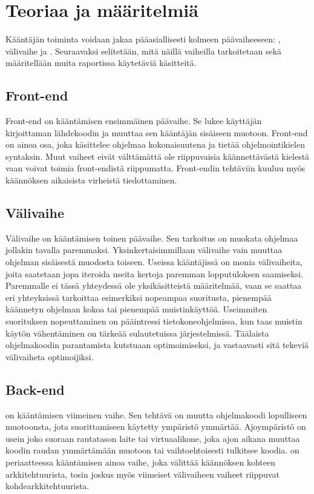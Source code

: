 
\section{Teoriaa ja määritelmiä}
Kääntäjän toiminta voidaan jakaa pääasiallisesti kolmeen päävaiheeseen:
, välivaihe ja .
Seuraavaksi selitetään, mitä näillä vaiheilla tarkoitetaan
sekä määritellään muita raportissa käytetäviä käsitteitä.


\subsection{Front-end}
Front-end on kääntämisen ensimmäinen päävaihe.
Se lukee käyttäjän kirjoittaman lähdekoodin
ja muuttaa sen kääntäjän sisäiseen muotoon.
Front-end on ainoa osa, joka käsittelee ohjelmaa kokonaisuutena
ja tietää ohjelmointikielen syntaksin.
Muut vaiheet eivät välttämättä ole riippuvaisia käännettävästä
kielestä vaan voivat toimia front-endistä riippumatta.
Front-endin tehtäviin kuuluu myös käännöksen aikaisista virheistä tiedottaminen.

\subsection{Välivaihe}
Välivaihe on kääntämisen toinen päävaihe.
Sen tarkoitus on muokata ohjelmaa jollakin tavalla paremmaksi.
Yksinkertaisimmillaan välivaihe vain muuttaa ohjelman sisäisestä
muodosta toiseen.
Useissa kääntäjissä on monia välivaiheita, joita saatetaan jopa
iteroida useita kertoja paremman lopputuloksen saamiseksi.
Paremmalle ei tässä yhteydessä ole yksikäsitteistä määritelmää,
vaan se saattaa eri yhteyksissä tarkoittaa esimerkiksi
nopeampaa suoritusta, pienempää käännetyn ohjelman kokoa
tai pienempää muistinkäyttöä. Useimmiten suorituksen nopeuttaminen
on pääintressi tietokoneohjelmissa, kun taas muistin käytön
vähentäminen on tärkeää sulautetuissa järjestelmissä.
Täälaista ohjelmakoodin parantamista kutstuaan optimoimiseksi,
ja vastaavasti sitä tekeviä välivaiheta optimoijiksi.

\subsection{Back-end}
 on kääntämisen viimeinen vaihe.
Sen tehtävä on muutta ohjelmakoodi lopulliseen muotoonsta,
jota suorittamiseen käytetty ympäristö ymmärtää.
Ajoympäristö on usein joko suoraan rautatason laite
tai virtuaalikone, joka ajon aikana muuttaa koodin raudan ymmärtämään muotoon
tai vaihtoehtoisesti tulkitsee koodia.
 on periaatteessa kääntämisen ainoa vaihe,
joka välittää käännöksen kohteen arkkitehtuurista,
tosin joskus myös viimeiset välivaiheen vaiheet riippuvat kohdearkkitehtuurista.

